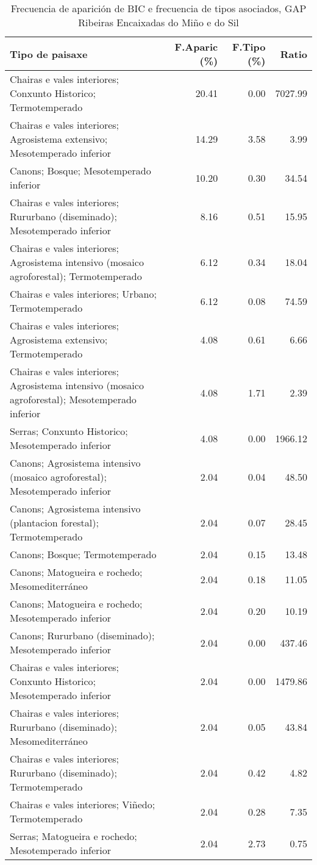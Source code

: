 \begin{table}[p]
\centering
\caption{Frecuencia de aparición de BIC e frecuencia de tipos asociados, GAP Ribeiras Encaixadas do Miño e do Sil} 
\label{vbic4}
\begin{tabular}{lrrr}
  \hline
Tipo de paisaxe & F.Aparic (\%) & F.Tipo (\%) & Ratio \\ 
  \hline
Chairas e vales interiores; Conxunto Historico; Termotemperado & 20.41 & 0.00 & 7027.99 \\ 
  Chairas e vales interiores; Agrosistema extensivo; Mesotemperado inferior & 14.29 & 3.58 & 3.99 \\ 
  Canons; Bosque; Mesotemperado inferior & 10.20 & 0.30 & 34.54 \\ 
  Chairas e vales interiores; Rururbano (diseminado); Mesotemperado inferior & 8.16 & 0.51 & 15.95 \\ 
  Chairas e vales interiores; Agrosistema intensivo (mosaico agroforestal); Termotemperado & 6.12 & 0.34 & 18.04 \\ 
  Chairas e vales interiores; Urbano; Termotemperado & 6.12 & 0.08 & 74.59 \\ 
  Chairas e vales interiores; Agrosistema extensivo; Termotemperado & 4.08 & 0.61 & 6.66 \\ 
  Chairas e vales interiores; Agrosistema intensivo (mosaico agroforestal); Mesotemperado inferior & 4.08 & 1.71 & 2.39 \\ 
  Serras; Conxunto Historico; Mesotemperado inferior & 4.08 & 0.00 & 1966.12 \\ 
  Canons; Agrosistema intensivo (mosaico agroforestal); Mesotemperado inferior & 2.04 & 0.04 & 48.50 \\ 
  Canons; Agrosistema intensivo (plantacion forestal); Termotemperado & 2.04 & 0.07 & 28.45 \\ 
  Canons; Bosque; Termotemperado & 2.04 & 0.15 & 13.48 \\ 
  Canons; Matogueira e rochedo; Mesomediterráneo & 2.04 & 0.18 & 11.05 \\ 
  Canons; Matogueira e rochedo; Mesotemperado inferior & 2.04 & 0.20 & 10.19 \\ 
  Canons; Rururbano (diseminado); Mesotemperado inferior & 2.04 & 0.00 & 437.46 \\ 
  Chairas e vales interiores; Conxunto Historico; Mesotemperado inferior & 2.04 & 0.00 & 1479.86 \\ 
  Chairas e vales interiores; Rururbano (diseminado); Mesomediterráneo & 2.04 & 0.05 & 43.84 \\ 
  Chairas e vales interiores; Rururbano (diseminado); Termotemperado & 2.04 & 0.42 & 4.82 \\ 
  Chairas e vales interiores; Viñedo; Termotemperado & 2.04 & 0.28 & 7.35 \\ 
  Serras; Matogueira e rochedo; Mesotemperado inferior & 2.04 & 2.73 & 0.75 \\ 
   \hline
\end{tabular}
\end{table}
